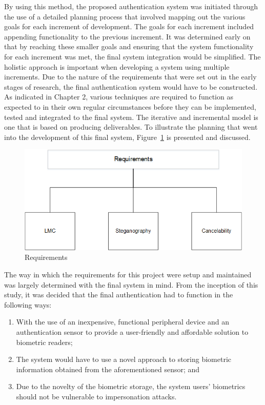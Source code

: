 By using this method, the proposed authentication system was initiated through the use of a detailed planning process that involved mapping out the various goals for each increment of development. The goals for each increment included appending functionality to the previous increment. It was determined early on that by reaching these smaller goals and ensuring that the system functionality for each increment was met, the final system integration would be simplified. The holistic approach is important when developing a system using multiple increments. Due to the nature of the requirements that were set out in the early stages of research, the final authentication system would have to be constructed. As indicated in Chapter 2, various techniques are required to function as expected to in their own regular circumstances before they can be implemented, tested and integrated to the final system. 
The iterative and incremental model is one that is based on producing deliverables. To illustrate the planning that went into the development of this final system, Figure~\ref{fig:Requirements} is presented and discussed. 

    
    \begin{figure}[htbp!] 
    \centering    
    \includegraphics[width=1.0\textwidth]{Chapter3/Figs/Figure3-2.png}
    \caption[Requirements]{Requirements}
    \label{fig:Requirements}
    \end{figure}    
    
    The way in which the requirements for this project were setup and maintained was largely determined with the final system in mind. From the inception of this study, it was decided that the final authentication had to function in the following ways:
    
    \begin{enumerate}[label=\roman*.]
    	\item With the use of an inexpensive, functional peripheral device and an authentication sensor to provide a user-friendly and affordable solution to biometric readers;
    	\item The system would have to use a novel approach to storing biometric information obtained from the aforementioned sensor; and
    	\item Due to the novelty of the biometric storage, the system users’ biometrics should not be vulnerable to impersonation attacks.
    \end{enumerate}
    
